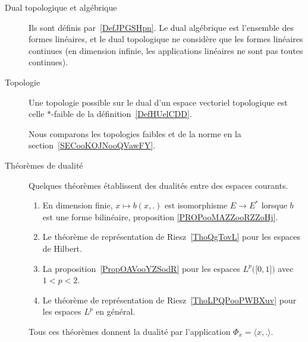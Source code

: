 \begin{description}
	\item[Dual topologique et algébrique]
		Ils sont définis par~\ref{DefJPGSHpn}. Le dual algébrique est l'ensemble des formes linéaires, et le dual topologique ne considère que les formes linéaires continues (en dimension infinie, les applications linéaires ne sont pas toutes continues).
	\item[Topologie]
		Une topologie possible sur le dual d'un espace vectoriel topologique est celle \( *\)-faible de la définition~\ref{DefHUelCDD}.

		Nous comparons les topologies faibles et de la norme en la section~\ref{SECooKOJNooQVawFY}.
	\item[Théorèmes de dualité]
		Quelques théorèmes établissent des dualités entre des espaces courants.
		\begin{enumerate}
			\item
			      En dimension finie, \( x\mapsto b(x,.)\) est isomorphisme \( E\to E^*\) lorsque \( b\) est une forme bilinéaire, proposition \ref{PROPooMAZZooRZZoHj}.
			\item
			      Le théorème de représentation de Riesz~\ref{ThoQgTovL} pour les espaces de Hilbert.
			\item
			      La proposition~\ref{PropOAVooYZSodR} pour les espaces \( L^p\big( \mathopen[ 0 , 1 \mathclose] \big)\) avec \( 1<p<2\).
			\item
			      Le théorème de représentation de Riesz~\ref{ThoLPQPooPWBXuv} pour les espaces \( L^p\) en général.
		\end{enumerate}
		Tous ces théorèmes donnent la dualité par l'application \( \Phi_x=\langle x, .\rangle \).

\end{description}
